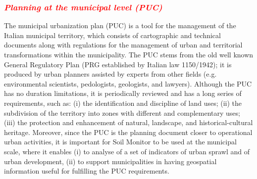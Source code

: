 \documentclass[APA,LATO1COL,doublespace]{WileyNJD-v2}
\newcommand{\toberevised}[1]{\emph{\textcolor{red}{#1}}} %
\begin{document}
\subsubsection{ \toberevised{Planning at the municipal level (PUC)} }
\label{sec:caseCOM}

The municipal urbanization plan (PUC) is a tool for the management of the Italian municipal territory, which consists of cartographic and technical documents along with regulations for the management of urban and territorial transformations within the municipality.
The PUC stems from the old well known General Regulatory Plan (PRG established by Italian law 1150/1942); it is produced by urban planners assisted by experts from other fields (e.g. environmental scientists, pedologists, geologists, and lawyers).
Although the PUC has no duration limitations, it is periodically reviewed and has a long series of requirements, such as: (i) the identification and discipline of land uses; (ii) the subdivision of the territory into zones with different and complementary uses; (iii) the protection and enhancement of natural, landscape, and historical-cultural heritage. 
Moreover, since the PUC is the planning document closer to operational urban activities, it is important for Soil Monitor to be used at the municipal scale, where it enables (i) to analyse of a set of indicators of urban sprawl and of urban development, (ii) to support municipalities in having geospatial information useful for fulfilling the PUC requirements.
\end{document}
